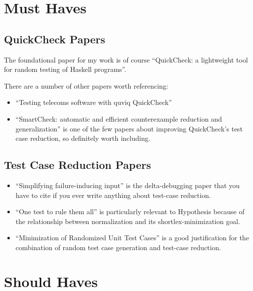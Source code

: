 \section{Must Haves}

\subsection{QuickCheck Papers}

The foundational paper for my work is of course ``QuickCheck: a lightweight tool for random testing of Haskell programs''\cite{DBLP:conf/icfp/ClaessenH00}.

There are a number of other papers worth referencing:

\begin{itemize}
\item ``Testing telecoms software with quviq QuickCheck''\cite{DBLP:conf/erlang/ArtsHJW06}
\item ``SmartCheck: automatic and efficient counterexample reduction and generalization''\cite{DBLP:conf/haskell/Pike14} is one of the few papers about improving QuickCheck's test case reduction,
so definitely worth including.
\end{itemize}

\subsection{Test Case Reduction Papers}

\begin{itemize}
\item ``Simplifying failure-inducing input''\cite{DBLP:conf/issta/HildebrandtZ00} is the delta-debugging paper that you have to cite if you ever write anything about test-case reduction.
\item ``One test to rule them all''\cite{DBLP:conf/issta/GroceHK17} is particularly relevant to Hypothesis because of the relationship between normalization and its shortlex-minimization goal.
\item ``Minimization of Randomized Unit Test Cases''\cite{DBLP:conf/issre/LeiA05} is a good justification for the combination of random test case generation and test-case reduction.
\end{itemize}


\section{Should Haves}

